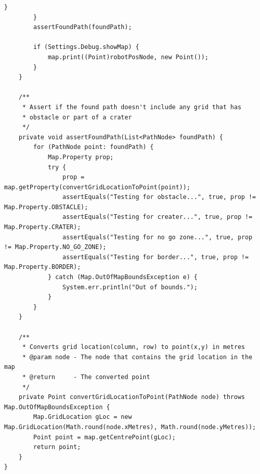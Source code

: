 \documentclass[12pt,a4paper]{article}
\begin{document}
\begin{lstlisting}[caption=PathFinding automated test suite 5, captionpos=b, label={lst:PathFindingAutomatedTestSuite5}]
			}
		}
		assertFoundPath(foundPath);
		
		if (Settings.Debug.showMap) {
			map.print((Point)robotPosNode, new Point());
		}
	}
	
	/**
	 * Assert if the found path doesn't include any grid that has 
	 * obstacle or part of a crater
	 */
	private void assertFoundPath(List<PathNode> foundPath) {
		for (PathNode point: foundPath) {
			Map.Property prop;
			try {
				prop = map.getProperty(convertGridLocationToPoint(point));
				assertEquals("Testing for obstacle...", true, prop != Map.Property.OBSTACLE);
				assertEquals("Testing for creater...", true, prop != Map.Property.CRATER);
				assertEquals("Testing for no go zone...", true, prop != Map.Property.NO_GO_ZONE);
				assertEquals("Testing for border...", true, prop != Map.Property.BORDER);
			} catch (Map.OutOfMapBoundsException e) {
				System.err.println("Out of bounds.");
			}
		}
	}
	
	/**
	 * Converts grid location(column, row) to point(x,y) in metres
	 * @param node - The node that contains the grid location in the map
	 * @return	   - The converted point
	 */
	private Point convertGridLocationToPoint(PathNode node) throws Map.OutOfMapBoundsException {
		Map.GridLocation gLoc = new Map.GridLocation(Math.round(node.xMetres), Math.round(node.yMetres));
		Point point = map.getCentrePoint(gLoc);
		return point;
	}
}
     \end{lstlisting}
    
\end{document}
